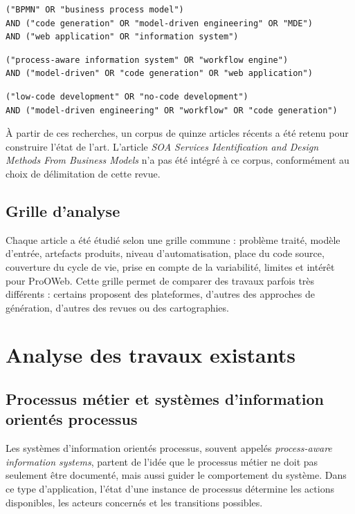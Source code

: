 \documentclass[12pt,a4paper]{article}
\begin{document}
\begin{verbatim}
("BPMN" OR "business process model")
AND ("code generation" OR "model-driven engineering" OR "MDE")
AND ("web application" OR "information system")
\end{verbatim}

\begin{verbatim}
("process-aware information system" OR "workflow engine")
AND ("model-driven" OR "code generation" OR "web application")
\end{verbatim}

\begin{verbatim}
("low-code development" OR "no-code development")
AND ("model-driven engineering" OR "workflow" OR "code generation")
\end{verbatim}

À partir de ces recherches, un corpus de quinze articles récents a été retenu pour construire l'état de l'art. L'article \textit{SOA Services Identification and Design Methods From Business Models} n'a pas été intégré à ce corpus, conformément au choix de délimitation de cette revue.

\subsection{Grille d'analyse}

Chaque article a été étudié selon une grille commune : problème traité, modèle d'entrée, artefacts produits, niveau d'automatisation, place du code source, couverture du cycle de vie, prise en compte de la variabilité, limites et intérêt pour ProOWeb. Cette grille permet de comparer des travaux parfois très différents : certains proposent des plateformes, d'autres des approches de génération, d'autres des revues ou des cartographies.

\section{Analyse des travaux existants}

\subsection{Processus métier et systèmes d'information orientés processus}

Les systèmes d'information orientés processus, souvent appelés \textit{process-aware information systems}, partent de l'idée que le processus métier ne doit pas seulement être documenté, mais aussi guider le comportement du système. Dans ce type d'application, l'état d'une instance de processus détermine les actions disponibles, les acteurs concernés et les transitions possibles.
\end{document}
